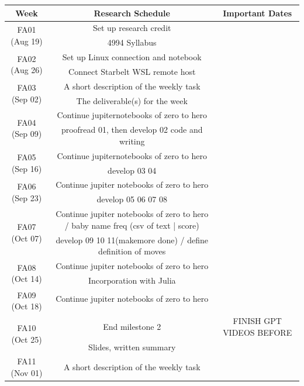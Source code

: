 \documentclass[letterpaper,11pt]{article}
\begin{document}
\begin{center}
\scriptsize
\begin{tabular}{c|c|c}
	Week & Research Schedule & Important Dates \\
	\hline
	\multirow{2}{*}{FA01 (Aug 19)} & Set up research credit & \\
  	                             & 4994 Syllabus & \\
	\hline
	\multirow{2}{*}{FA02 (Aug 26)} & Set up Linux connection and notebook \\
  	                             & Connect Starbelt WSL remote host \\
	\hline
	\multirow{2}{*}{FA03 (Sep 02)} & A short description of the weekly task & \\
  	                             & The deliverable(s) for the week & \\
	\hline
	\multirow{2}{*}{FA04 (Sep 09)} & Continue jupiternotebooks of zero to hero  \\
  	                             & proofread 01, then develop 02 code and writing \\
	\hline
	\multirow{2}{*}{FA05 (Sep 16)} & Continue jupiternotebooks of zero to hero & \\
  	                             & develop 03 04 & \\
	\hline
	\multirow{2}{*}{FA06 (Sep 23)} & Continue jupiter notebooks of zero to hero & \\
  	                             & develop 05 06 07 08& \\
	\hline
	\multirow{2}{*}{FA07 (Oct 07)} & Continue jupiter notebooks of zero to hero / baby name freq (csv of text | score) & \\
  	                             & develop 09 10 11(makemore done) / define definition of moves & \\
	\hline
	\multirow{2}{*}{FA08 (Oct 14)} & Continue jupiter notebooks of zero to hero & \\
  	                             & Incorporation with Julia& \\
	\hline
	\multirow{2}{*}{FA09 (Oct 18)} & Continue jupiter notebooks of zero to hero \\
  	                             &  \\
	\hline
	\multirow{2}{*}{FA10 (Oct 25)} & End milestone 2 & FINISH GPT VIDEOS BEFORE \\
  	                             & Slides, written summary & \\
	\hline
	\multirow{2}{*}{FA11 (Nov 01)} & A short description of the weekly task & \\

\end{tabular}
\end{center}
\end{document}
